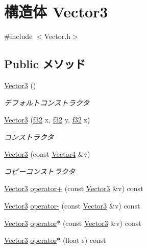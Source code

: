 \hypertarget{struct_vector3}{\section{構造体 Vector3}
\label{struct_vector3}
}


{\ttfamily \#include $<$Vector.\-h$>$}

\subsection*{Public メソッド}
\begin{DoxyCompactItemize}
\item 
\hyperlink{struct_vector3_a0f49191f7e001e7f7ae1cb49522118b4}{Vector3} ()
\begin{DoxyCompactList}\small\item\em デフォルトコンストラクタ \end{DoxyCompactList}\item 
\hyperlink{struct_vector3_a26134d4a4ff38b5b147a6e0e862d841d}{Vector3} (\hyperlink{_main_8h_a5f6906312a689f27d70e9d086649d3fd}{f32} x, \hyperlink{_main_8h_a5f6906312a689f27d70e9d086649d3fd}{f32} y, \hyperlink{_main_8h_a5f6906312a689f27d70e9d086649d3fd}{f32} z)
\begin{DoxyCompactList}\small\item\em コンストラクタ \end{DoxyCompactList}\item 
\hyperlink{struct_vector3_a4f9ead673c773229334355789b6aacc2}{Vector3} (const \hyperlink{struct_vector4}{Vector4} \&v)
\begin{DoxyCompactList}\small\item\em コピーコンストラクタ \end{DoxyCompactList}\item 
\hyperlink{struct_vector3}{Vector3} \hyperlink{struct_vector3_a1b5bb43ee5524cd793c3dc7c44ba507b}{operator+} (const \hyperlink{struct_vector3}{Vector3} \&v) const 
\item 
\hyperlink{struct_vector3}{Vector3} \hyperlink{struct_vector3_adf9aba350d84593481892bb802190402}{operator-\/} (const \hyperlink{struct_vector3}{Vector3} \&v) const 
\item 
\hyperlink{struct_vector3}{Vector3} \hyperlink{struct_vector3_ad562abcac8ba809c6d54d3f783ef3312}{operator$\ast$} (const \hyperlink{struct_vector3}{Vector3} \&v) const 
\item 
\hyperlink{struct_vector3}{Vector3} \hyperlink{struct_vector3_aa74938e1a0fd2096924fa9ace442783f}{operator$\ast$} (float s) const 

\end{DoxyCompactItemize}
